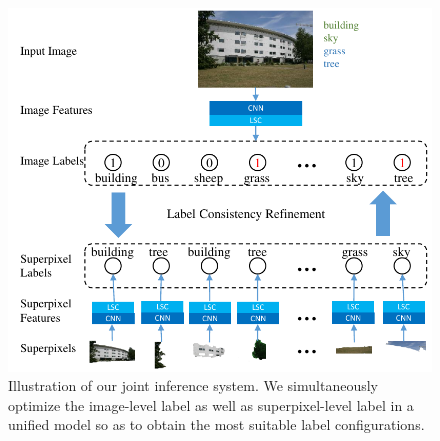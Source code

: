 \begin{figure}[tb]
    \begin{center}
        \includegraphics[width=1\linewidth]{fig_framework.pdf}
    \end{center}
    \vspace{-3mm}
    \caption{Illustration of our joint inference system. We simultaneously optimize the image-level label as well as superpixel-level label in a unified model so as to obtain the most suitable label configurations.}
    \label{fig:framework}
\end{figure}

